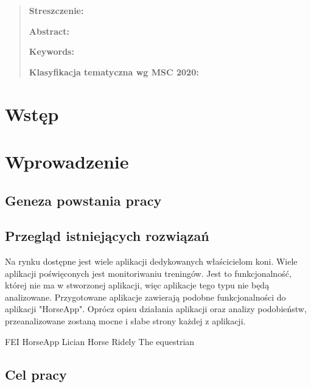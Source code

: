 \documentclass[12pt,twoside]{report}
\begin{document}
	\thispagestyle{empty}
	\mbox{}
	
	\begin{quote}{\small 
			\noindent
			
			\bigskip
			\noindent
			\textbf{Streszczenie:} 
			
			
			\noindent
			\newline
			\textbf{}
			\vspace{5pt}
			
			\noindent
			\newline
			\textbf{Abstract:} 
			\vspace{5pt}
			
			\vspace{5pt}
			\noindent
			\newline
			\textbf{Keywords:} 
			\vspace{5pt}
			\bigskip
			
			\noindent 
			\textbf{Klasyfikacja tematyczna wg  MSC 2020:}}
	\end{quote}

	\mbox{}
	
	\pagestyle{plain}
	\tableofcontents
	\thispagestyle{empty}
	
	
	\newpage
	\setcounter{page}{1}
	\newpage
\chapter*{Wstęp}
\chapter{Wprowadzenie}
\section{Geneza powstania pracy}
\section{Przegląd istniejących rozwiązań}
Na rynku dostępne jest wiele aplikacji dedykowanych właścicielom koni. Wiele aplikacji poświęconych jest monitoriwaniu treningów. Jest to funkcjonalność, której nie ma w stworzonej aplikacji, więc aplikacje tego typu nie będą analizowane. Przygotowane aplikacje zawierają podobne funkcjonalności do aplikacji "HorseApp". Oprócz opisu działania aplikacji oraz analizy podobieństw, przeanalizowane zostaną mocne i słabe strony każdej z aplikacji.

FEI HorseApp
Lician Horse
Ridely
The equestrian
\section{Cel pracy}
\end{document}
